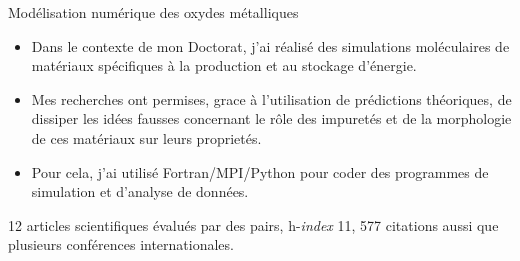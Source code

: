 \documentclass[10pt,a4paper,ragged2e,academicons]{altacv}
\begin{document}
\divider

Modélisation numérique des oxydes métalliques
\smallskip
\begin{itemize}
\item Dans le contexte de mon Doctorat, j'ai réalisé des simulations moléculaires de matériaux spécifiques à la production et au stockage d'énergie.
\item Mes recherches ont permises, grace à l'utilisation de prédictions théoriques, de dissiper les idées fausses concernant le rôle des impuretés et de la morphologie de ces matériaux sur leurs proprietés. 
\item Pour cela, j'ai utilisé Fortran/MPI/Python pour coder des programmes de simulation et d'analyse de données.
\end{itemize}
{\small 12 articles scientifiques évalués par des pairs, h-\textit{index} 11, 577 citations aussi que plusieurs conférences internationales.}

\end{document}
